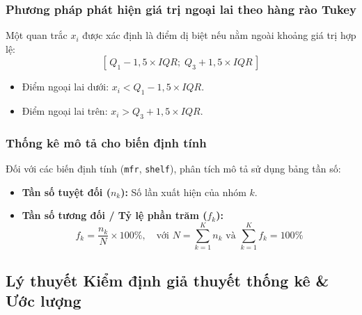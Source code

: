 \documentclass[12pt,a4paper]{article}
\begin{document}
\subsubsection{Phương pháp phát hiện giá trị ngoại lai theo hàng rào Tukey}
\label{sec:tukey}

Một quan trắc $x_i$ được xác định là điểm dị biệt nếu nằm ngoài khoảng giá trị hợp lệ:
\begin{equation}
  \left[\,Q_1 - 1{,}5 \times IQR;\; Q_3 + 1{,}5 \times IQR\,\right]
\end{equation}
\begin{itemize}
  \item Điểm ngoại lai dưới: $x_i < Q_1 - 1{,}5 \times IQR$.
  \item Điểm ngoại lai trên: $x_i > Q_3 + 1{,}5 \times IQR$.
\end{itemize}

\subsubsection{Thống kê mô tả cho biến định tính}

Đối với các biến định tính (\texttt{mfr}, \texttt{shelf}), phân tích mô tả sử dụng bảng tần số:
\begin{itemize}
  \item \textbf{Tần số tuyệt đối ($n_k$):} Số lần xuất hiện của nhóm $k$.
  \item \textbf{Tần số tương đối / Tỷ lệ phần trăm ($f_k$):}
  \begin{equation}
    f_k = \frac{n_k}{N}\times 100\%, \quad \text{với } N = \sum_{k=1}^{K} n_k
    \text{ và } \sum_{k=1}^{K} f_k = 100\%
  \end{equation}
\end{itemize}

\subsection{Lý thuyết Kiểm định giả thuyết thống kê \& Ước lượng}
\end{document}
